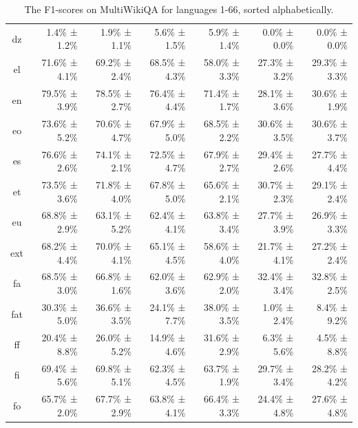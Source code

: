 \documentclass[10pt, a4paper]{article}
\begin{document}
\begin{table}[h]
\begin{tabular}{crrrrrr}
dz & 1.4\% ± 1.2\% & 1.9\% ± 1.1\% & 5.6\% ± 1.5\% & 5.9\% ± 1.4\% & 0.0\% ± 0.0\% & 0.0\% ± 0.0\% \\
el & 71.6\% ± 4.1\% & 69.2\% ± 2.4\% & 68.5\% ± 4.3\% & 58.0\% ± 3.3\% & 27.3\% ± 3.2\% & 29.3\% ± 3.3\% \\
en & 79.5\% ± 3.9\% & 78.5\% ± 2.7\% & 76.4\% ± 4.4\% & 71.4\% ± 1.7\% & 28.1\% ± 3.6\% & 30.6\% ± 1.9\% \\
eo & 73.6\% ± 5.2\% & 70.6\% ± 4.7\% & 67.9\% ± 5.0\% & 68.5\% ± 2.2\% & 30.6\% ± 3.5\% & 30.6\% ± 3.7\% \\
es & 76.6\% ± 2.6\% & 74.1\% ± 2.1\% & 72.5\% ± 4.7\% & 67.9\% ± 2.7\% & 29.4\% ± 2.6\% & 27.7\% ± 4.4\% \\
et & 73.5\% ± 3.6\% & 71.8\% ± 4.0\% & 67.8\% ± 5.0\% & 65.6\% ± 2.1\% & 30.7\% ± 2.3\% & 29.1\% ± 2.4\% \\
eu & 68.8\% ± 2.9\% & 63.1\% ± 5.2\% & 62.4\% ± 4.1\% & 63.8\% ± 3.4\% & 27.7\% ± 3.9\% & 26.9\% ± 3.3\% \\
ext & 68.2\% ± 4.4\% & 70.0\% ± 4.1\% & 65.1\% ± 4.5\% & 58.6\% ± 4.0\% & 21.7\% ± 4.1\% & 27.2\% ± 2.4\% \\
fa & 68.5\% ± 3.0\% & 66.8\% ± 1.6\% & 62.0\% ± 3.6\% & 62.9\% ± 2.0\% & 32.4\% ± 3.4\% & 32.8\% ± 2.5\% \\
fat & 30.3\% ± 5.0\% & 36.6\% ± 3.5\% & 24.1\% ± 7.7\% & 38.0\% ± 3.5\% & 1.0\% ± 2.4\% & 8.4\% ± 9.2\% \\
ff & 20.4\% ± 8.8\% & 26.0\% ± 5.2\% & 14.9\% ± 4.6\% & 31.6\% ± 2.9\% & 6.3\% ± 5.6\% & 4.5\% ± 8.8\% \\
fi & 69.4\% ± 5.6\% & 69.8\% ± 5.1\% & 62.3\% ± 4.5\% & 63.7\% ± 1.9\% & 29.7\% ± 3.4\% & 28.2\% ± 4.2\% \\
fo & 65.7\% ± 2.0\% & 67.7\% ± 2.9\% & 63.8\% ± 4.1\% & 66.4\% ± 3.3\% & 24.4\% ± 4.8\% & 27.6\% ± 4.8\% \\
\hline
\end{tabular}
\caption{The F1-scores on MultiWikiQA for languages 1-66, sorted alphabetically.}
\label{tab:num-samples-in-small-subsets}
\end{table}
\end{document}
